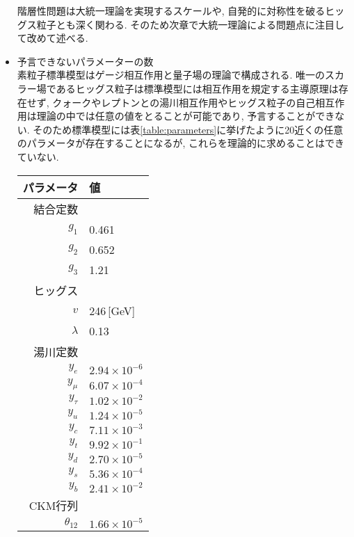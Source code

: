 \begin{itemize}
            階層性問題は大統一理論を実現するスケールや, 自発的に対称性を破るヒッグス粒子とも深く関わる.
            そのため次章で大統一理論による問題点に注目して改めて述べる.
      \item 予言できないパラメーターの数\\
            素粒子標準模型はゲージ相互作用と量子場の理論で構成される.
            唯一のスカラー場であるヒッグス粒子は標準模型には相互作用を規定する主導原理は存在せず, クォークやレプトンとの湯川相互作用やヒッグス粒子の自己相互作用は理論の中では任意の値をとることが可能であり, 予言することができない.
            そのため標準模型には表\ref{table:parameters}に挙げたように20近くの任意のパラメータが存在することになるが, これらを理論的に求めることはできていない.
\begin{table}[ht]
  \begin{center}
    \begin{tabular}{rl}\hline\hline
      パラメータ&  値 \\\hline
      結合定数  &     \\
      $g_1$ & 0.461  \\
                 $g_2$ & 0.652  \\
                 $g_3$ & 1.21   \\\hline
                 ヒッグス &    \\
       $v$  & 246\,[GeV]\\
               $\lambda$  & 0.13 \\\hline
                湯川定数  &  \\
               $y_e$     & $2.94\times 10^{-6}$ \\
                          $y_\mu$   & $6.07\times 10^{-4}$ \\
                          $y_\tau$  & $1.02\times 10^{-2}$ \\
                          $y_u$     & $1.24\times 10^{-5}$ \\
                          $y_c$     & $7.11\times 10^{-3}$ \\
                          $y_t$     & $9.92\times 10^{-1}$ \\
                          $y_d$     & $2.70\times 10^{-5}$ \\
                          $y_s$     & $5.36\times 10^{-4}$ \\
                          $y_b$     & $2.41\times 10^{-2}$ \\\hline
                 CKM行列 &  \\
                 $\theta_{12}$ & $ 1.66\times 10^{-5}$ \\

\end{tabular}
\end{center}
\end{table}
\end{itemize}
